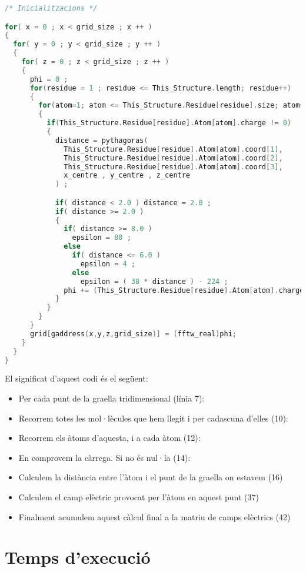\begin{lstlisting}[label=ef0, caption=Codi original d'electric\_field, language=C]
/* Inicialitzacions */

for( x = 0 ; x < grid_size ; x ++ )
{
  for( y = 0 ; y < grid_size ; y ++ )
  {
    for( z = 0 ; z < grid_size ; z ++ )
    {
      phi = 0 ;
      for(residue = 1 ; residue <= This_Structure.length; residue++)
      {
        for(atom=1; atom <= This_Structure.Residue[residue].size; atom++)
        {
          if(This_Structure.Residue[residue].Atom[atom].charge != 0)
          {
            distance = pythagoras(
              This_Structure.Residue[residue].Atom[atom].coord[1],
              This_Structure.Residue[residue].Atom[atom].coord[2],
              This_Structure.Residue[residue].Atom[atom].coord[3],
              x_centre , y_centre , z_centre
            ) ;

            if( distance < 2.0 ) distance = 2.0 ;
            if( distance >= 2.0 )
            {
              if( distance >= 8.0 )
                epsilon = 80 ;
              else
                if( distance <= 6.0 )
                  epsilon = 4 ;
                else
                  epsilon = ( 38 * distance ) - 224 ;
              phi += (This_Structure.Residue[residue].Atom[atom].charge / (epsilon * distance));
            }
          }
        }
      }
      grid[gaddress(x,y,z,grid_size)] = (fftw_real)phi;
    }
  }
}
\end{lstlisting}

El significat d'aquest codi és el següent:

\begin{itemize}
  \item Per cada punt de la graella tridimensional (línia 7):
  \item Recorrem totes les mol·lècules que hem llegit i per cadascuna d'elles (10):
  \item Recorrem els àtoms d'aquesta, i a cada àtom (12):
  \item En comprovem la càrrega. Si no és nul·la (14):
  \item Calculem la distància entre l'àtom i el punt de la graella on estavem (16)
  \item Calculem el camp elèctric provocat per l'àtom en aquest punt (37)
  \item Finalment acumulem aquest càlcul final a la matriu de camps elèctrics (42)
\end{itemize}

\section{Temps d'execució}

